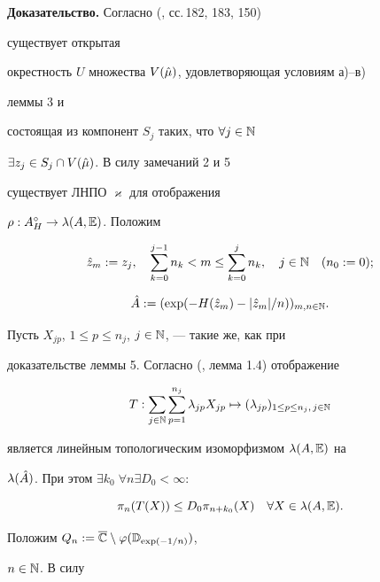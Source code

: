 \medskip


 


{\bf Доказательство.} Согласно (\cite{Lev}, сс.\,182, 183, 150)


существует открытая 


окрестность $U$ множества $V(\Hat\mu)$, удовлетворяющая условиям а)--в) 


леммы 3 и 


состоящая из компонент $S_j$ таких, что $\forall j\in\Bbb N$ 


$\exists z_j\in S_j\cap V(\Hat\mu)$. В силу замечаний 2 и 5 


существует ЛНПО $\varkappa$ для отображения 


$\rho :A^\circ_H\to\lambda(A,\Bbb E)$. Положим 


$$ 


\Hat z_m:=z_j,\quad \sum^{j-1}_{k=0}n_k<m\le\sum^j_{k=0}n_k, 


\quad j\in\Bbb N\quad (n_0:=0); 


$$ 


$$ 


\Hat A:=(\exp(-H(\Hat z_m)-|\Hat z_m|/n))_{m,n\in\Bbb N}. 


$$ 


Пусть $X_{jp}$, $1\le p\le n_j$, $j\in\Bbb N$, --- такие же, как при 


доказательстве леммы 5. Согласно (\cite{Mei2}, лемма 1.4) отображение 


$$ 


T:\sum_{j\in\Bbb N}\sum_{p=1}^{n_j}\lambda_{jp}X_{jp}\mapsto 


(\lambda_{jp})_{1\le p\le n_j,\,j\in\Bbb N} 


$$ 


является линейным топологическим изоморфизмом $\lambda(A,\Bbb E)$ на 


$\lambda(\Hat A)$. При этом $\exists k_0\; \forall n \exists D_0<\infty :$ 


\begin{equation} 


\pi_n(T(X))\le D_0\pi_{n+k_0}(X)\quad \forall X\in\lambda(A,\Bbb E). 


\end{equation} 


 


Положим $Q_n:=\overline{\Bbb C}\setminus\varphi(\Bbb D_{\exp(-1/n)})$, 


$n\in \Bbb N$. В силу 


